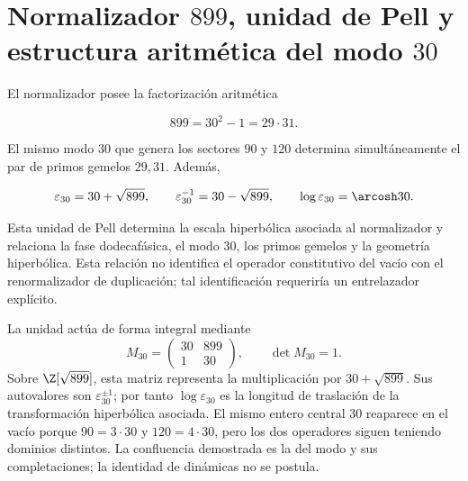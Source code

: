 \section{Normalizador \(899\), unidad de Pell y estructura aritm\'etica del modo \(30\)}

El normalizador posee la factorizaci\'on aritm\'etica

\begin{equation}
899=30^2-1=29\cdot31.
\label{mab:rm:eq:899}
\end{equation}

El mismo modo \(30\) que genera los sectores \(90\) y \(120\) determina
simult\'aneamente el par de primos gemelos \(29,31\). Adem\'as,

\begin{equation}
\varepsilon_{30}=30+\sqrt{899},\qquad
\varepsilon_{30}^{-1}=30-\sqrt{899},\qquad
\log\varepsilon_{30}=\arcosh30.
\label{mab:rm:eq:pell30}
\end{equation}

Esta unidad de Pell determina la escala hiperb\'olica asociada al
normalizador y relaciona la fase dodecaf\'asica, el modo \(30\), los primos
gemelos y la geometr\'ia hiperb\'olica. Esta relaci\'on no identifica el
operador constitutivo del vac\'io con el renormalizador de duplicaci\'on; tal
identificaci\'on requerir\'ia un entrelazador expl\'icito.

La unidad act\'ua de forma integral mediante
\begin{equation}
M_{30}=\begin{pmatrix}30&899\\1&30\end{pmatrix},
\qquad \det M_{30}=1.
\label{mab:rm:eq:pell-matrix30}
\end{equation}
Sobre \(\Z[\sqrt{899}]\), esta matriz representa la multiplicaci\'on por
\(30+\sqrt{899}\). Sus autovalores son \(\varepsilon_{30}^{\pm1}\); por
tanto \(\log\varepsilon_{30}\) es la longitud de traslaci\'on de la transformaci\'on
hiperb\'olica asociada. El mismo entero central \(30\) reaparece en el vac\'io
porque \(90=3\cdot30\) y \(120=4\cdot30\), pero los dos operadores siguen
teniendo dominios distintos. La confluencia demostrada es la del modo y sus
completaciones; la identidad de din\'amicas no se postula.

